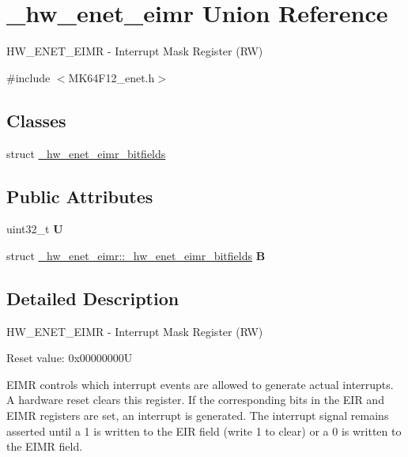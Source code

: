 \hypertarget{union__hw__enet__eimr}{}\section{\+\_\+hw\+\_\+enet\+\_\+eimr Union Reference}
\label{union__hw__enet__eimr}


H\+W\+\_\+\+E\+N\+E\+T\+\_\+\+E\+I\+MR -\/ Interrupt Mask Register (RW)  




{\ttfamily \#include $<$M\+K64\+F12\+\_\+enet.\+h$>$}

\subsection*{Classes}
\begin{DoxyCompactItemize}
\item 
struct \hyperlink{struct__hw__enet__eimr_1_1__hw__enet__eimr__bitfields}{\+\_\+hw\+\_\+enet\+\_\+eimr\+\_\+bitfields}
\end{DoxyCompactItemize}
\subsection*{Public Attributes}
\begin{DoxyCompactItemize}
\item 
uint32\+\_\+t {\bfseries U}\hypertarget{union__hw__enet__eimr_a16e3085a0b6b6413ee9d73f1ab938c42}{}\label{union__hw__enet__eimr_a16e3085a0b6b6413ee9d73f1ab938c42}

\item 
struct \hyperlink{struct__hw__enet__eimr_1_1__hw__enet__eimr__bitfields}{\+\_\+hw\+\_\+enet\+\_\+eimr\+::\+\_\+hw\+\_\+enet\+\_\+eimr\+\_\+bitfields} {\bfseries B}\hypertarget{union__hw__enet__eimr_ada417d44b37f825ac558d7cab237566e}{}\label{union__hw__enet__eimr_ada417d44b37f825ac558d7cab237566e}

\end{DoxyCompactItemize}


\subsection{Detailed Description}
H\+W\+\_\+\+E\+N\+E\+T\+\_\+\+E\+I\+MR -\/ Interrupt Mask Register (RW) 

Reset value\+: 0x00000000U

E\+I\+MR controls which interrupt events are allowed to generate actual interrupts. A hardware reset clears this register. If the corresponding bits in the E\+IR and E\+I\+MR registers are set, an interrupt is generated. The interrupt signal remains asserted until a 1 is written to the E\+IR field (write 1 to clear) or a 0 is written to the E\+I\+MR field. 

